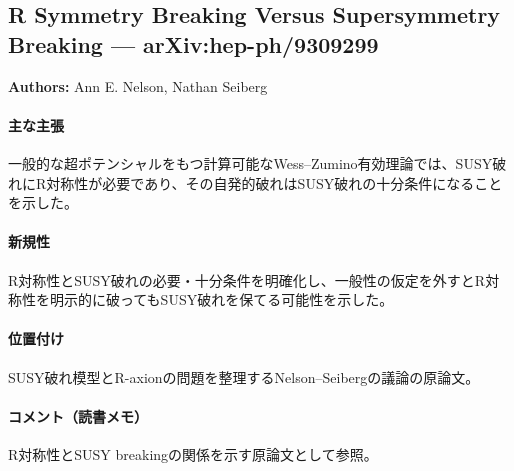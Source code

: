 \subsection{R Symmetry Breaking Versus Supersymmetry Breaking --- arXiv:hep-ph/9309299}

\textbf{Authors:} Ann E. Nelson, Nathan Seiberg

\paragraph{主な主張}
一般的な超ポテンシャルをもつ計算可能なWess--Zumino有効理論では、SUSY破れにR対称性が必要であり、その自発的破れはSUSY破れの十分条件になることを示した\cite{Nelson:1993nf}。

\paragraph{新規性}
R対称性とSUSY破れの必要・十分条件を明確化し、一般性の仮定を外すとR対称性を明示的に破ってもSUSY破れを保てる可能性を示した。

\paragraph{位置付け}
SUSY破れ模型とR-axionの問題を整理するNelson--Seibergの議論の原論文。

\paragraph{コメント（読書メモ）}
R対称性とSUSY breakingの関係を示す原論文として参照。
